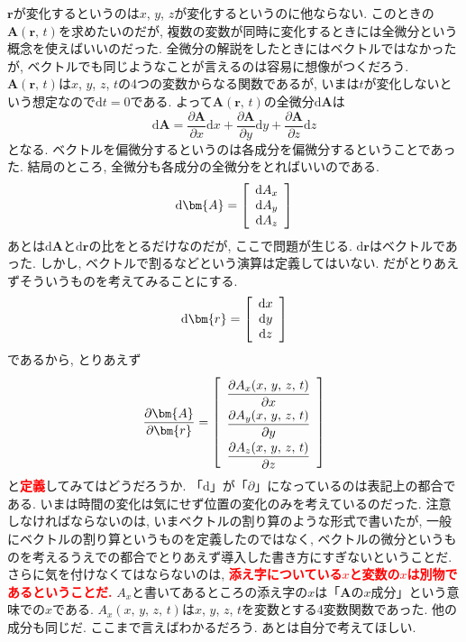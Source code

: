 $\bm{r}$が変化するというのは$x$, $y$, $z$が変化するというのに他ならない. 
このときの$\bm{A}(\bm{r}, \, t)$を求めたいのだが, 複数の変数が同時に変化するときには全微分という概念を使えばいいのだった. 
全微分の解説をしたときにはベクトルではなかったが, ベクトルでも同じようなことが言えるのは容易に想像がつくだろう. 
$\bm{A}(\bm{r}, \, t)$は$x$, $y$, $z$, $t$の4つの変数からなる関数であるが, 
いまは$t$が変化しないという想定なので$\mathrm{d}t = 0$である. よって$\bm{A}(\bm{r}, \, t)$の全微分$\mathrm{d}\bm{A}$は
$$
\mathrm{d}\bm{A} =
\frac{\partial \bm{A}}{\partial x} \mathrm{d}x + \frac{\partial \bm{A}}{\partial y} \mathrm{d}y + 
\frac{\partial \bm{A}}{\partial z} \mathrm{d}z
$$
となる. ベクトルを偏微分するというのは各成分を偏微分するということであった. 
結局のところ, 全微分も各成分の全微分をとればいいのである. 
$$
\mathrm{d}\bm{A} = \left[
\renewcommand{\arraystretch}{1}
\begin{array}{c}
 \mathrm{d} A_x \\
 \mathrm{d} A_y \\
 \mathrm{d} A_z
 \end{array}
 \right]
$$
あとは$\mathrm{d}\bm{A}$と$\mathrm{d}\bm{r}$の比をとるだけなのだが, ここで問題が生じる. 
$\mathrm{d}\bm{r}$はベクトルであった. しかし, ベクトルで割るなどという演算は定義してはいない. 
だがとりあえずそういうものを考えてみることにする. 
$$
\mathrm{d}\bm{r} = \left[
\renewcommand{\arraystretch}{1}
\begin{array}{c}
 \mathrm{d} x \\
 \mathrm{d} y \\
 \mathrm{d} z
 \end{array}
 \right]
$$
であるから, とりあえず
\begin{eqnarray}
\frac{\partial \bm{A}}{\partial \bm{r}} = \left[
\renewcommand{\arraystretch}{2}
\begin{array}{c}
\displaystyle
\frac{\partial A_x (x, \, y, \, z, \, t)}{\partial x} \\
\displaystyle
\frac{\partial A_y (x, \, y, \, z, \, t)}{\partial y} \\
\displaystyle
\frac{\partial A_z (x, \, y, \, z, \, t)}{\partial z}
\end{array}
\right]
\label{eq:vecvecbibun}
\end{eqnarray}
と\textbf{\textcolor{red}{定義}}してみてはどうだろうか. 「$\mathrm{d}$」が「$\partial$」になっているのは表記上の都合である. いまは時間の変化は気にせず位置の変化のみを考えているのだった. 
注意しなければならないのは, いまベクトルの割り算のような形式で書いたが, 一般にベクトルの割り算というものを定義したのではなく, 
ベクトルの微分というものを考えるうえでの都合でとりあえず導入した書き方にすぎないということだ. 
さらに気を付けなくてはならないのは, \textbf{\textcolor{red}{添え字についている$x$と変数の$x$は別物であるということだ.}}
$A_x$と書いてあるところの添え字の$x$は「$\bm{A}$の$x$成分」という意味での$x$である. 
$A_x (x, \, y, \, z, \, t)$は$x$, $y$, $z$, $t$を変数とする4変数関数であった. 他の成分も同じだ. 
ここまで言えばわかるだろう. あとは自分で考えてほしい. 

